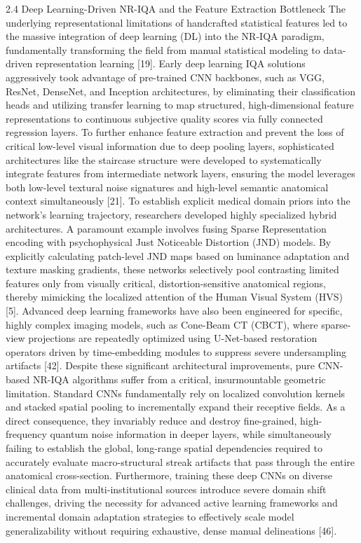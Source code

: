 2.4 Deep Learning-Driven NR-IQA and the Feature Extraction Bottleneck The underlying representational limitations of handcrafted statistical features led to the massive integration of deep learning (DL) into the NR-IQA paradigm, fundamentally transforming the field from manual statistical modeling to data-driven representation learning [19]. Early deep learning IQA solutions aggressively took advantage of pre-trained CNN backbones, such as VGG, ResNet, DenseNet, and Inception architectures, by eliminating their classification heads and utilizing transfer learning to map structured, high-dimensional feature representations to continuous subjective quality scores via fully connected regression layers. To further enhance feature extraction and prevent the loss of critical low-level visual information due to deep pooling layers, sophisticated architectures like the staircase structure were developed to systematically integrate features from intermediate network layers, ensuring the model leverages both low-level textural noise signatures and high-level semantic anatomical context simultaneously [21]. To establish explicit medical domain priors into the network's learning trajectory, researchers developed highly specialized hybrid architectures. A paramount example involves fusing Sparse Representation encoding with psychophysical Just Noticeable Distortion (JND) models. By explicitly calculating patch-level JND maps based on luminance adaptation and texture masking gradients, these networks selectively pool contrasting limited features only from visually critical, distortion-sensitive anatomical regions, thereby mimicking the localized attention of the Human Visual System (HVS) [5]. Advanced deep learning frameworks have also been engineered for specific, highly complex imaging models, such as Cone-Beam CT (CBCT), where sparse-view projections are repeatedly optimized using U-Net-based restoration operators driven by time-embedding modules to suppress severe undersampling artifacts [42]. Despite these significant architectural improvements, pure CNN-based NR-IQA algorithms suffer from a critical, insurmountable geometric limitation. Standard CNNs fundamentally rely on localized convolution kernels and stacked spatial pooling to incrementally expand their receptive fields. As a direct consequence, they invariably reduce and destroy fine-grained, high-frequency quantum noise information in deeper layers, while simultaneously failing to establish the global, long-range spatial dependencies required to accurately evaluate macro-structural streak artifacts that pass through the entire anatomical cross-section. Furthermore, training these deep CNNs on diverse clinical data from multi-institutional sources introduce severe domain shift challenges, driving the necessity for advanced active learning frameworks and incremental domain adaptation strategies to effectively scale model generalizability without requiring exhaustive, dense manual delineations [46].
